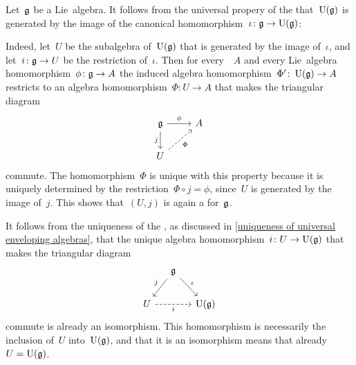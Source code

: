 \begin{remark}
  Let~$\mathfrak{g}$ be a Lie~algebra.
  It follows from the universal propery of the {\ua} that~$\operatorname{U}(\mathfrak{g})$ is generated by the image of the canonical homomorphism~$\iota \colon \mathfrak{g} \to \operatorname{U}(\mathfrak{g})$:
  
  Indeed, let~$U$ be the subalgebra of~$\operatorname{U}(\mathfrak{g})$ that is generated by the image of~$\iota$, and let~$i \colon \mathfrak{g} \to U$ be the restriction of~$\iota$.
  Then for every~{\algebra{$\kf$}}~$A$ and every Lie~algebra homomorphism~$\phi \colon \mathfrak{g} \to A$ the induced algebra homomorphism~$\Phi' \colon \operatorname{U}(\mathfrak{g}) \to A$ restricts to an algebra homomorphism~$\Phi \colon U \to A$ that makes the triangular diagram
  \[
    \begin{tikzcd}
      \glie
      \arrow{r}[above]{\phi}
      \arrow{d}[left]{j}
      &
      A
      \\
      U
      \arrow[dashed]{ur}[below right]{\Phi}
      &
      {}
    \end{tikzcd}
  \]
  commute.
  The homomorphism~$\Phi$ is unique with this property because it is uniquely determined by the restriction~$\Phi \circ j = \phi$, since~$U$ is generated by the image of~$j$.
  This shows that~$(U, j)$ is again a {\ua} for~$\mathfrak{g}$.
  
  It follows from the uniqueness of the {\ua}, as discussed in \cref{uniqueness of universal enveloping algebras}, that the unique algebra homomorphism~$i \colon U \to \operatorname{U}(\mathfrak{g})$ that makes the triangular diagram
  \[
    \begin{tikzcd}[column sep = small]
      {}
      &
      \glie
      \arrow{dl}[above left]{j}
      \arrow{dr}[above right]{\iota}
      &
      {}
      \\
      U
      \arrow[dashed]{rr}[below]{i}
      &
      {}
      &
      \Univ(\glie)
    \end{tikzcd}
  \]
  commute is already an isomorphism.
  This homomorphism is necessarily the inclusion of~$U$ into~$\operatorname{U}(\mathfrak{g})$, and that it is an isomorphism means that already~$U = \operatorname{U}(\mathfrak{g})$.
  

\end{remark}
